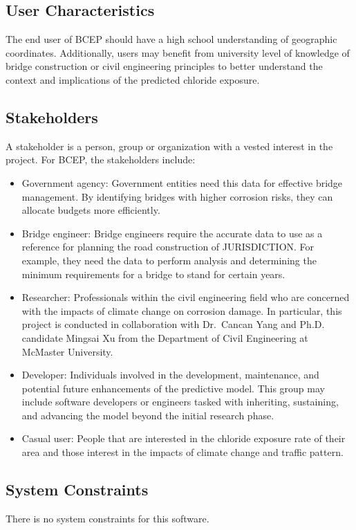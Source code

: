 \documentclass[12pt]{article}
\begin{document}
\subsection{User Characteristics} \label{SecUserCharacteristics}
The end user of BCEP should have a high school understanding of geographic coordinates. Additionally, users may benefit from university level of knowledge of bridge construction or civil engineering principles to better understand the context and implications of the predicted chloride exposure.

\subsection{Stakeholders} \label{Stakeholders}
 A stakeholder is a person, group or organization with a vested interest in the project. For BCEP, the stakeholders include:

\begin{itemize}
\item Government agency: Government entities need this data for effective bridge management. By identifying bridges with higher corrosion risks, they can allocate budgets more efficiently.
\item Bridge engineer: Bridge engineers require the accurate data to use as a reference for planning the road construction of JURISDICTION. For example, they need the data to perform analysis and determining the minimum requirements for a bridge to stand for certain years. 
\item Researcher: Professionals within the civil engineering field who are concerned with the impacts of climate change on corrosion damage. In particular, this project is conducted in collaboration with Dr.\ Cancan Yang and Ph.D. candidate Mingsai Xu from the Department of Civil Engineering at McMaster University.
\item Developer: Individuals involved in the development, maintenance, and potential future enhancements of the predictive model. This group may include software developers or engineers tasked with inheriting, sustaining, and advancing the model beyond the initial research phase.
\item Casual user: People that are interested in the chloride exposure rate of their area and those interest in the impacts of climate change and traffic pattern. 
\end{itemize}


\subsection{System Constraints}
There is no system constraints for this software.
  
\end{document}

